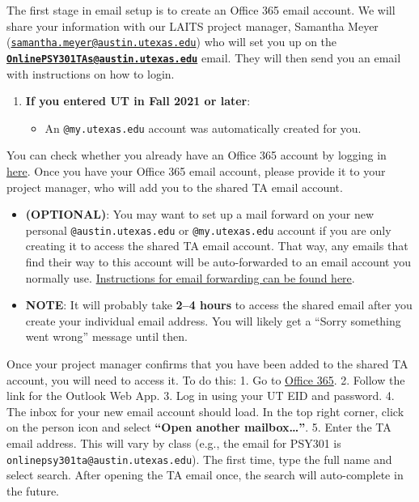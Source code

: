 \documentclass[
]{article}
\providecommand{\tightlist}{%
  \setlength{\itemsep}{0pt}\setlength{\parskip}{0pt}}
\begin{document}
The first stage in email setup is to create an Office 365 email account. We will share your information with our LAITS project manager, Samantha Meyer (\href{mailto:samantha.meyer@austin.utexas.edu}{\nolinkurl{samantha.meyer@austin.utexas.edu}}) who will set you up on the \textbf{\href{mailto:OnlinePSY301TAs@austin.utexas.edu}{\nolinkurl{OnlinePSY301TAs@austin.utexas.edu}}} email. They will then send you an email with instructions on how to login.

\begin{enumerate}
\def\labelenumi{\arabic{enumi}.}
\tightlist
\item
  \textbf{If you entered UT in Fall 2021 or later}:

  \begin{itemize}
  \tightlist
  \item
    An \texttt{@my.utexas.edu} account was automatically created for you.
  \end{itemize}
\end{enumerate}

You can check whether you already have an Office 365 account by logging in \href{https://www.austin.utexas.edu/Office365Management/}{here}. Once you have your Office 365 email account, please provide it to your project manager, who will add you to the shared TA email account.

\begin{itemize}
\tightlist
\item
  \textbf{(OPTIONAL)}: You may want to set up a mail forward on your new personal \texttt{@austin.utexas.edu} or \texttt{@my.utexas.edu} account if you are only creating it to access the shared TA email account. That way, any emails that find their way to this account will be auto-forwarded to an email account you normally use. \href{https://ut.service-now.com/sp?id=kb_article\&number=KB0011657}{Instructions for email forwarding can be found here}.
\item
  \textbf{NOTE}: It will probably take \textbf{2--4 hours} to access the shared email after you create your individual email address. You will likely get a ``Sorry something went wrong'' message until then.
\end{itemize}

Once your project manager confirms that you have been added to the shared TA account, you will need to access it. To do this:
1. Go to \href{https://office365.austin.utexas.edu}{Office 365}.
2. Follow the link for the Outlook Web App.
3. Log in using your UT EID and password.
4. The inbox for your new email account should load. In the top right corner, click on the person icon and select \textbf{``Open another mailbox\ldots{}''}.
5. Enter the TA email address. This will vary by class (e.g., the email for PSY301 is \texttt{onlinepsy301ta@austin.utexas.edu}). The first time, type the full name and select search. After opening the TA email once, the search will auto-complete in the future.
\end{document}
